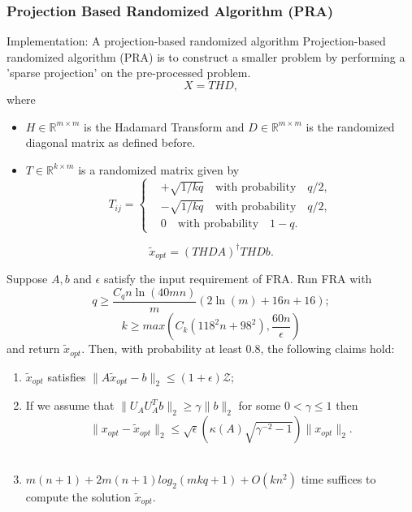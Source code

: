 \subsubsection{Projection Based Randomized Algorithm (PRA)}
Implementation: A projection-based randomized algorithm
Projection-based randomized algorithm (PRA) is to construct a smaller problem by performing a 'sparse projection' on the pre-processed problem.
$$
X = THD,
$$
where
\begin{itemize}
\item $H \in \mathbb{R}^{m \times m}$ is the Hadamard Transform and $D \in \mathbb{R}^{m \times m }$ is the randomized diagonal matrix as defined before. \\
\item $T \in \mathbb{R}^{k \times m}$ is a randomized matrix given by
$$
T_{ij} = \begin{cases} &+ \sqrt{1/kq} \quad \text{with probability} \quad q/2, \\
                                   &-  \sqrt{1/kq} \quad \text{with probability} \quad q/2, \\
                                   & 0 \quad \text{with probability} \quad 1-q.
             \end{cases}
$$
\end{itemize}
$$\tilde{x}_{opt} = (THDA)^{\dagger} THDb. $$


\begin{theorem}
Suppose $A,b$ and $\epsilon$ satisfy the input requirement of FRA. Run FRA with
\begin{equation}
q \geq \frac{C_q n \ln(40mn)}{m} (2 \ln(m) + 16n + 16);
\end{equation}
\begin{equation}
k \geq max \left( C_k (118^2 n + 98^2), \frac{60n}{\epsilon} \right)
\end{equation}
and return $\tilde{x}_{opt}.$ Then, with probability at least $0.8$, the following claims hold:
\begin{enumerate}
\item $\tilde{x}_{opt}$ satisfies $\| A \tilde{x}_{opt} - b \|_2  \leq (1 + \epsilon) \mathcal{Z}; $ \\
\item If we assume that $\| U_A  U_A^T b \|_2 \geq \gamma \|b\|_2 $ for some $0< \gamma \leq 1$ then
$$
\| x_{opt} - \tilde{x}_{opt}\|_2 \leq \sqrt{\epsilon} \left( \kappa(A) \sqrt{\gamma^{-2} -1} \right) \| x_{opt}\|_2.
$$\\
\item $m(n+1) + 2m(n+1)log_2(mkq+1) + O(kn^2)$ time suffices to compute the solution $\tilde{x}_{opt}. $
\end{enumerate}
\end{theorem}



